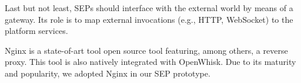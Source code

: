 Last but not least, SEPs should interface with the external world by means of a gateway. Its role is to map external invocations (e.g., HTTP, WebSocket) to the platform services. %

Nginx is a state-of-art tool open source tool featuring, among others, a reverse proxy. This tool is also natively integrated with OpenWhisk. 
Due to its maturity and popularity, we adopted Nginx in our SEP prototype.


